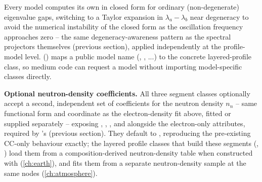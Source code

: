 \begin{implbox}
Every model computes its own  in closed form for
ordinary (non-degenerate) eigenvalue gaps, switching to a Taylor expansion
in $\lambda_a-\lambda_b$ near degeneracy to avoid the numerical instability
of the closed form as the oscillation frequency approaches zero -- the same
degeneracy-awareness pattern as the spectral projectors themselves
(previous section), applied independently at the profile-model level.
 ()
maps a public model name (, , ...) to the
concrete layered-profile class, so medium code can request a model without
importing model-specific classes directly.

\textbf{Optional neutron-density coefficients.} All three segment classes
optionally accept a second, independent set of coefficients for the neutron
density $n_n$ -- same functional form and coordinate as the electron-density
fit above, fitted or supplied separately -- exposing ,
, , and
 alongside the electron-only attributes,
required by 's
 (previous section). They default to
, reproducing the pre-existing CC-only behaviour exactly; the
layered profile classes that build these segments
(, ) load them from
a composition-derived neutron-density table when constructed with
 (\cref{ch:earth}), and
 fits them from a separate neutron-density
sample at the same nodes (\cref{ch:atmosphere}).
\end{implbox}
